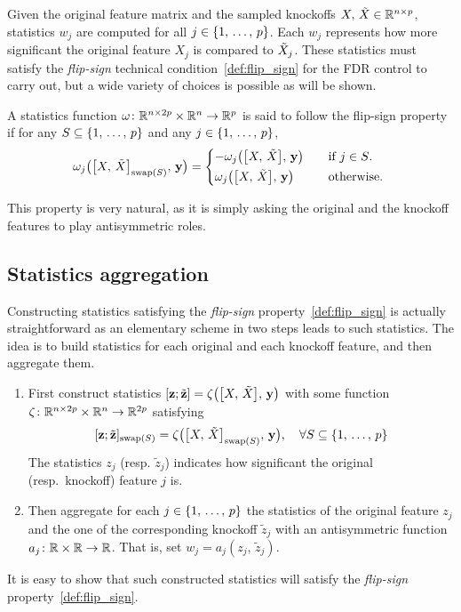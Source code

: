 Given the original feature matrix and the sampled knockoffs $X,\, \tilde{X} \in \mathbb{R}^{n \times p}$,
statistics $w_j$ are computed for all $j \in \left\{ 1,\, \dots,\, p \right\}$.
Each $w_j$ represents how more significant the original feature $X_j$ is compared to $\tilde{X}_j$.
These statistics must satisfy the \emph{flip-sign} technical condition~\ref{def:flip_sign}
for the FDR control to carry out,
but a wide variety of choices is possible as will be shown.
\begin{definition}\label{def:flip_sign}
A statistics function $\omega \colon \mathbb{R}^{n \times 2p} \times \mathbb{R}^n \to \mathbb{R}^p$
is said to follow the flip-sign property if for any $S \subseteq \left\{ 1,\, \dots,\, p \right\}$ and any $j \in \left\{ 1,\, \dots,\, p \right\}$,
\begin{equation*}
    \omega_j\big( \big[ X,\, \tX \big]_{\swap(S)},\, \yy \big) = \begin{cases*}
        -\omega_j\big( \big[ X,\, \tX \big],\, \yy \big) &\quad\text{if $j \in S$.}\\
        \omega_j\big( \big[ X,\, \tX \big],\, \yy \big) &\quad\text{otherwise.}
    \end{cases*}
\end{equation*}
\end{definition}
This property is very natural,
as it is simply asking the original and the knockoff features to play antisymmetric roles.

\subsection{Statistics aggregation}\label{subsec:ksa}

Constructing statistics satisfying the \emph{flip-sign} property~\ref{def:flip_sign} is actually straightforward
as an elementary scheme in two steps leads to such statistics.
The idea is to build statistics for each original and each knockoff feature, and then aggregate them.
\begin{enumerate}
    \item First construct statistics $[ \mathbf{z}; \tilde{\mathbf{z}} ] = \zeta\big( \big[ X,\, \tilde{X} \big],\, \mathbf{y} \big)$
        with some function $\zeta \colon \mathbb{R}^{n \times 2p} \times \mathbb{R}^n \to \mathbb{R}^{2p}$ satisfying
        \begin{equation}\label{eq:swap_cond}
        [ \mathbf{z}; \tilde{\mathbf{z}} ]_{\operatorname{swap}(S)} = \zeta\big( \big[ X,\, \tilde{X} \big]_{\operatorname{swap}(S)},\, \mathbf{y} \big)
        ,\quad
        \forall S \subseteq \left\{ 1,\, \dots,\, p \right\}
        \end{equation}
        The statistics $z_j$ (resp. $\tilde{z}_j$) indicates how significant the original (resp.\ knockoff) feature $j$ is.
    \item Then aggregate for each $j \in \left\{ 1,\, \dots,\, p \right\}$ the statistics of the original feature $z_j$ and the one of the corresponding
        knockoff $\tilde{z}_j$ with an antisymmetric function $a_j \colon \mathbb{R}\times\mathbb{R} \to \mathbb{R}$.
        That is, set $w_j = a_j(z_j,\, \tilde{z}_j)$.
\end{enumerate}
It is easy to show that such constructed statistics will satisfy the \emph{flip-sign} property~\ref{def:flip_sign}.

